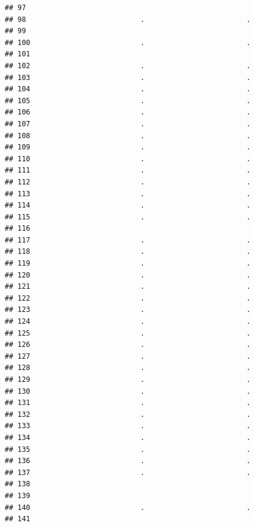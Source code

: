 \documentclass[
]{article}
\begin{document}
\begin{verbatim}
## 97                                                     
## 98                           .                        .
## 99                                                     
## 100                          .                        .
## 101                                                    
## 102                          .                        .
## 103                          .                        .
## 104                          .                        .
## 105                          .                        .
## 106                          .                        .
## 107                          .                        .
## 108                          .                        .
## 109                          .                        .
## 110                          .                        .
## 111                          .                        .
## 112                          .                        .
## 113                          .                        .
## 114                          .                        .
## 115                          .                        .
## 116                                                    
## 117                          .                        .
## 118                          .                        .
## 119                          .                        .
## 120                          .                        .
## 121                          .                        .
## 122                          .                        .
## 123                          .                        .
## 124                          .                        .
## 125                          .                        .
## 126                          .                        .
## 127                          .                        .
## 128                          .                        .
## 129                          .                        .
## 130                          .                        .
## 131                          .                        .
## 132                          .                        .
## 133                          .                        .
## 134                          .                        .
## 135                          .                        .
## 136                          .                        .
## 137                          .                        .
## 138                                                    
## 139                                                    
## 140                          .                        .
## 141                                                    

\end{verbatim}
\end{document}
